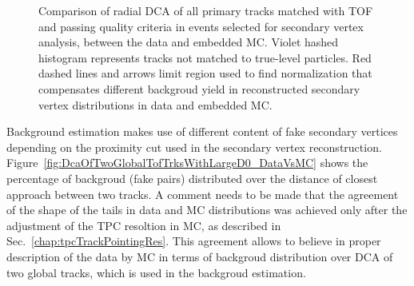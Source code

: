 \begin{figure}[b!]
\begin{minipage}{.4725\textwidth}
  \caption[Comparison of radial DCA of all primary tracks matched with TOF and passing quality criteria in events selected for secondary vertex analysis, between the data and embedded MC.]
   {Comparison of radial DCA of all primary tracks matched with TOF and passing quality criteria in events selected for secondary vertex analysis, between the data and embedded MC. Violet hashed histogram represents tracks not matched to true-level particles. Red dashed lines and arrows limit region used to find normalization that compensates different backgroud yield in reconstructed secondary vertex distributions in data and embedded MC.}
   \label{fig:primaryDcaSelectedEvtsDataVsMC}%
\end{minipage}%
\end{figure}%

Background estimation makes use of different content of fake secondary vertices depending on the proximity cut used in the secondary vertex reconstruction. Figure~\ref{fig:DcaOfTwoGlobalTofTrksWithLargeD0_DataVsMC} shows the percentage of backgroud (fake pairs) distributed over the distance of closest approach between two tracks. A comment needs to be made that the agreement of the shape of the tails in data and MC distributions was achieved only after the adjustment of the TPC resoltion in MC, as described in Sec.~\ref{chap:tpcTrackPointingRes}. This agreement allows to believe in proper description of the data by MC in terms of backgroud distribution over DCA of two global tracks, which is used in the backgroud estimation.

